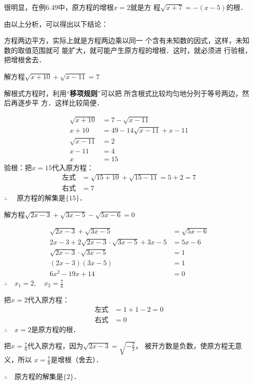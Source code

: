 很明显，在例6.49中，原方程的增根$x=2$就是方
程$\sqrt{x+7}=-(x-5)$的根．

由以上分析，可以得出以下结论：

\begin{blk}{}
    方程两边平方，实际上就是方程两边乘以同一
个含有未知数的因式，这样，未知数的取值范围就可
能扩大，就可能产生原方程的增根．这时，就必须进
行验根，把增根舍去．
\end{blk}



\begin{example}
    解方程$\sqrt{x+10}+\sqrt{x-11}=7$
\end{example}

\begin{analyze}
    解根式方程时，利用“\textbf{移项规则}”可以把
所含根式比较均匀地分列于等号两边，然后再逐步平
方．这样比较简便．
\end{analyze}


\begin{solution}
\begin{align*}
    \sqrt{x+10}&=7-\sqrt{x-11}\tag{移项}\\
x+10&=49-14\sqrt{x-11}+x-11  \tag{两边平方}\\
\sqrt{x-11}&=2\\
x-11&=4 \tag{两边平方}\\
x&=15
\end{align*}
验根：把$x=15$代入原方程：
\[\begin{split}
    \text{左式}&=\sqrt{15+10}+\sqrt{15-11}=5+2=7\\
    \text{右式}&=7
\end{split}\]
$\therefore\quad $
原方程的解集是$\{15\}$．
\end{solution}

\begin{example}
    解方程$\sqrt{2x-3}+\sqrt{3x-5}-\sqrt{5x-6}=0$
\end{example}

\begin{solution}
\begin{align*}
    \sqrt{2x-3}+\sqrt{3x-5}&=\sqrt{5x-6}  \tag{移项}\\
2x-3+2\sqrt{2x-3}\cdot \sqrt{3x-5}+3x-5&=5x-6  \tag{两边平方}\\
\sqrt{2x-3}\cdot \sqrt{3x-5}&=1\\
(2x-3)(3x-5)&=1   \tag{两边平方}\\
6x^2-19x+14&=0
\end{align*}
$\therefore\quad x_1=2,\quad x_2=\frac{7}{6}$

把$x=2$代入原方程：
\[\begin{split}
    \text{左式}&=1+1-2=0\\
    \text{右式}&=0
\end{split}\]
$\therefore\quad x=2$是原方程的根．

把$x=\frac{7}{6}$代入原方程，因为$\sqrt{2x-3}=\sqrt{-\frac{2}{3}}$，
被开方数是负数，使原方程无意义，所以
$x=\frac{7}{6}$是增根（舍去）．

$\therefore\quad $原方程的解集是$\{2\}$．
\end{solution}

